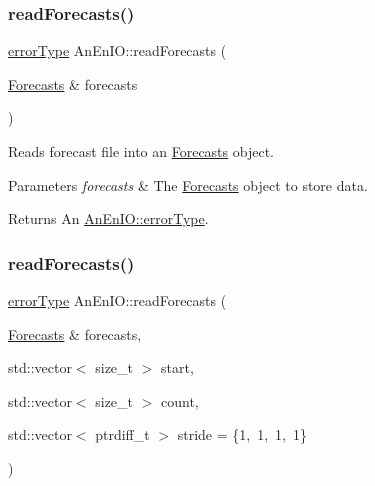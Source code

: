 \mbox{\label{class_an_en_i_o_a912e513e58fa258e1dce67ff161abab2}} 
\subsubsection{\texorpdfstring{read\+Forecasts()}{readForecasts()}\hspace{0.1cm}{\footnotesize\ttfamily [1/2]}}
{\footnotesize\ttfamily \mbox{\hyperlink{class_an_en_i_o_aa56bc1ec6610b86db4349bce20f9ead0}{error\+Type}} An\+En\+I\+O\+::read\+Forecasts (\begin{DoxyParamCaption}\item[{\mbox{\hyperlink{class_forecasts}{Forecasts}} \&}]{forecasts }\end{DoxyParamCaption})}

Reads forecast file into an \mbox{\hyperlink{class_forecasts}{Forecasts}} object.


\begin{DoxyParams}{Parameters}
{\em forecasts} & The \mbox{\hyperlink{class_forecasts}{Forecasts}} object to store data. \\
\hline
\end{DoxyParams}
\begin{DoxyReturn}{Returns}
An \mbox{\hyperlink{class_an_en_i_o_aa56bc1ec6610b86db4349bce20f9ead0}{An\+En\+I\+O\+::error\+Type}}. 
\end{DoxyReturn}
\mbox{\label{class_an_en_i_o_a5a66859433f123352fbd1f0ba606363c}} 
\subsubsection{\texorpdfstring{read\+Forecasts()}{readForecasts()}\hspace{0.1cm}{\footnotesize\ttfamily [2/2]}}
{\footnotesize\ttfamily \mbox{\hyperlink{class_an_en_i_o_aa56bc1ec6610b86db4349bce20f9ead0}{error\+Type}} An\+En\+I\+O\+::read\+Forecasts (\begin{DoxyParamCaption}\item[{\mbox{\hyperlink{class_forecasts}{Forecasts}} \&}]{forecasts,  }\item[{std\+::vector$<$ size\+\_\+t $>$}]{start,  }\item[{std\+::vector$<$ size\+\_\+t $>$}]{count,  }\item[{std\+::vector$<$ ptrdiff\+\_\+t $>$}]{stride = {\ttfamily \{1,~1,~1,~1\}} }\end{DoxyParamCaption})}

